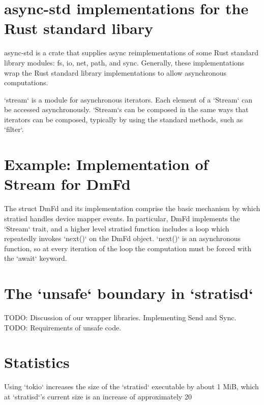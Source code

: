\documentclass[]{article}
\begin{document}
\section{async-std implementations for the Rust standard libary}
async-std is a crate that supplies async reimplementations of some Rust standard library modules: fs, io, net, path, and
sync. Generally, these implementations wrap the Rust standard library implementations to allow asynchronous computations.

`stream` is a module for asynchronous iterators. Each element of a `Stream` can be accessed asynchronously. `Stream`s can be composed in the same ways that iterators can be composed, typically by using the standard methods, such as `filter`.

\section{Example: Implementation of Stream for DmFd}
The struct DmFd and its implementation comprise the basic mechanism by which stratisd handles device mapper events. In particular, DmFd implements the `Stream` trait, and a higher level stratisd function includes a loop which repeatedly invokes `next()` on the DmFd object. `next()` is an asynchronous function, so at every iteration of the loop the computation must be forced with the `await` keyword.

\section{The `unsafe` boundary in `stratisd`}
TODO: Discussion of our wrapper libraries. Implementing Send and Sync.
TODO: Requirements of unsafe code.

\section{Statistics}
Using `tokio` increases the size of the `stratisd` executable by about 1 MiB, which at `stratisd`'s current size is an increase of approximately 20%
\end{document}
